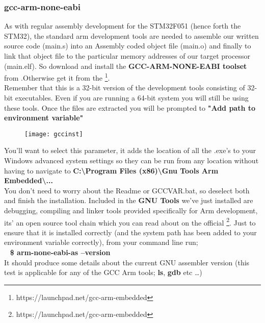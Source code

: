 \subsubsection{gcc-arm-none-eabi}
\label{subsec:gccinst}
As with regular assembly development for the STM32F051 (hence forth the STM32), the standard arm development tools are needed to assemble our written source code (main.s) into an Assembly coded object file (main.o) and finally to link that object file to the particular memory addresses of our target processor (main.elf). 
So download and install the \textbf{\color{Brown} GCC-ARM-NONE-EABI toolset} from \href{https://vula.uct.ac.za/x/m9Z91P}{\color{Blue} \underline{}}.Otherwise get it from the  \href{https://launchpad.net/gcc-arm-embedded}{\color{Blue}\underline{}}\footnote{https://launchpad.net/gcc-arm-embedded}.
\\
Remember that this is a 32-bit version of the development tools consisting of 32-bit executables. Even if you are running a 64-bit system you will still be using these tools. Once the files are extracted you will be prompted to \textbf{\color{Purple}"Add path to environment variable"}
\begin{figure}[hbtp]
\centering
\texttt{[image: gccinst]}
\end{figure}
\newpage
You'll want to select this parameter, it adds the location of all the .exe's to your Windows advanced system settings so they can be run from any location without having to navigate to \textbf{\color{Aquamarine} C:\textbackslash Program Files (x86)\textbackslash Gnu Tools Arm Embedded\textbackslash ... }
\\
You don't need to worry about the Readme or GCCVAR.bat, so deselect both and finish the installation. Included in the \textbf{\color{Brown} GNU Tools} we've just installed are debugging, compiling and linker tools provided specifically for Arm development, its' an open source tool chain which you can read about on the official \href{https://launchpad.net/gcc-arm-embedded}{\color{Blue} \underline{}}\footnote{https://launchpad.net/gcc-arm-embedded}. Just to ensure that it is installed correctly (and the system path has been added to your environment variable correctly), from your command line run;
\\
\-\ \hspace{20pt} \textbf{\color{YellowGreen} \$  arm-none-eabi-as --version}
\\
It should produce some details about the current GNU assembler version (this test is applicable for any of the GCC Arm tools; \textbf{ls}, \textbf{gdb} etc \ldots)
